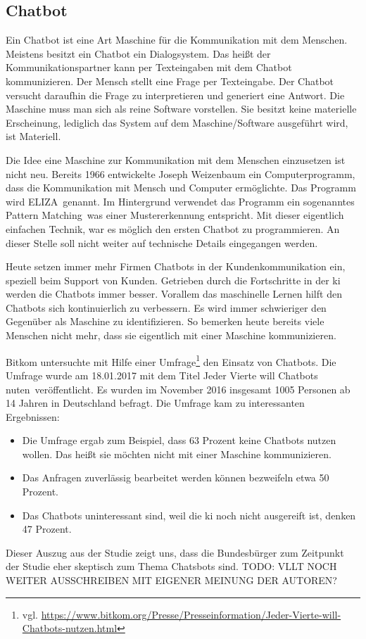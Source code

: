 \subsection{Chatbot}
Ein Chatbot ist eine Art Maschine für die Kommunikation mit dem Menschen. Meistens besitzt ein Chatbot ein Dialogsystem. Das heißt der Kommunikationspartner kann per Texteingaben mit dem Chatbot kommunizieren. Der Mensch stellt eine Frage per Texteingabe. Der Chatbot versucht daraufhin die Frage zu interpretieren und generiert eine Antwort. Die Maschine muss man sich als reine Software vorstellen. Sie besitzt keine materielle Erscheinung, lediglich das System auf dem Maschine/Software ausgeführt wird, ist Materiell.

Die Idee eine Maschine zur Kommunikation mit dem Menschen einzusetzen ist nicht neu. Bereits 1966 entwickelte Joseph Weizenbaum ein Computerprogramm, dass die Kommunikation mit Mensch und Computer ermöglichte. Das Programm wird \glqq ELIZA\grqq\ genannt. Im Hintergrund verwendet das Programm ein sogenanntes \glqq Pattern Matching\grqq\, was einer Mustererkennung entspricht. Mit dieser eigentlich einfachen Technik, war es möglich den ersten Chatbot zu programmieren. An dieser Stelle soll nicht weiter auf technische Details eingegangen werden.    

Heute setzen immer mehr Firmen Chatbots in der Kundenkommunikation ein, speziell beim Support von Kunden. Getrieben durch die Fortschritte in der \ac{ki} werden die Chatbots immer besser. Vorallem das maschinelle Lernen hilft den Chatbots sich kontinuierlich zu verbessern. Es wird immer schwieriger den Gegenüber als Maschine zu identifizieren. So bemerken heute bereits viele Menschen nicht mehr, dass sie eigentlich mit einer Maschine kommunizieren. 

Bitkom untersuchte mit Hilfe einer Umfrage\footnote{vgl. \url{https://www.bitkom.org/Presse/Presseinformation/Jeder-Vierte-will-Chatbots-nutzen.html}} den Einsatz von Chatbots. Die Umfrage wurde am 18.01.2017 mit dem Titel \glqq Jeder Vierte will Chatbots nuten\grqq\ veröffentlicht. Es wurden im November 2016 insgesamt 1005 Personen ab 14 Jahren in Deutschland befragt. Die Umfrage kam zu interessanten Ergebnissen:
\begin{itemize}
 	\item Die Umfrage ergab zum Beispiel, dass 63 Prozent keine Chatbots nutzen wollen. Das heißt sie möchten nicht mit 		einer Maschine kommunizieren. 
	 \item Das Anfragen zuverlässig bearbeitet werden können bezweifeln etwa 50 Prozent.
	 \item Das Chatbots uninteressant sind, weil die \ac{ki} noch nicht ausgereift ist, denken 47 Prozent.
\end{itemize}
Dieser Auszug aus der Studie zeigt uns, dass die Bundesbürger zum Zeitpunkt der Studie eher skeptisch zum Thema Chatsbots sind. TODO: VLLT NOCH WEITER AUSSCHREIBEN MIT EIGENER MEINUNG DER AUTOREN?







